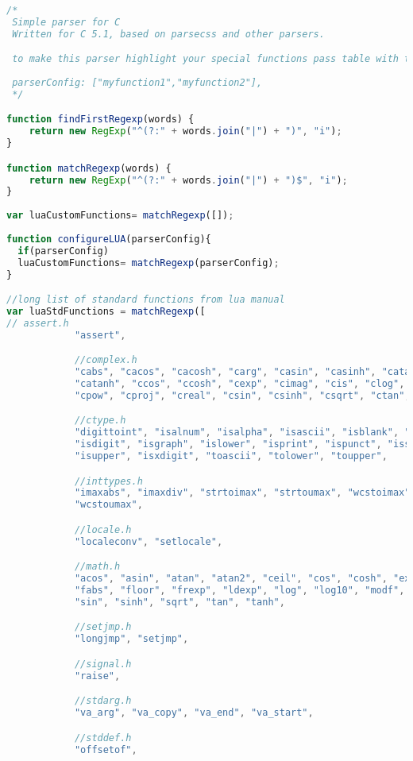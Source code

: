 \begin{lstlisting}[language=Javascript]
/*
 Simple parser for C
 Written for C 5.1, based on parsecss and other parsers.

 to make this parser highlight your special functions pass table with this functions names to parserConfig argument of creator,
  
 parserConfig: ["myfunction1","myfunction2"],
 */

function findFirstRegexp(words) {
    return new RegExp("^(?:" + words.join("|") + ")", "i");
}

function matchRegexp(words) {
    return new RegExp("^(?:" + words.join("|") + ")$", "i");
}
 
var luaCustomFunctions= matchRegexp([]);
 
function configureLUA(parserConfig){
  if(parserConfig)
  luaCustomFunctions= matchRegexp(parserConfig);
}

//long list of standard functions from lua manual
var luaStdFunctions = matchRegexp([
// assert.h
            "assert",

            //complex.h
            "cabs", "cacos", "cacosh", "carg", "casin", "casinh", "catan",
            "catanh", "ccos", "ccosh", "cexp", "cimag", "cis", "clog", "conj",
            "cpow", "cproj", "creal", "csin", "csinh", "csqrt", "ctan", "ctanh",

            //ctype.h
            "digittoint", "isalnum", "isalpha", "isascii", "isblank", "iscntrl",
            "isdigit", "isgraph", "islower", "isprint", "ispunct", "isspace",
            "isupper", "isxdigit", "toascii", "tolower", "toupper",

            //inttypes.h
            "imaxabs", "imaxdiv", "strtoimax", "strtoumax", "wcstoimax",
            "wcstoumax",

            //locale.h
            "localeconv", "setlocale",

            //math.h
            "acos", "asin", "atan", "atan2", "ceil", "cos", "cosh", "exp",
            "fabs", "floor", "frexp", "ldexp", "log", "log10", "modf", "pow",
            "sin", "sinh", "sqrt", "tan", "tanh",

            //setjmp.h
            "longjmp", "setjmp",

            //signal.h
            "raise",

            //stdarg.h
            "va_arg", "va_copy", "va_end", "va_start",

            //stddef.h
            "offsetof",


\end{lstlisting}
